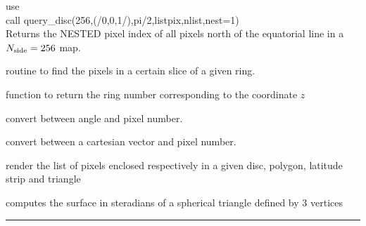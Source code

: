 \begin{example}
{
use  \\
call query\_disc(256,(/0,0,1/),pi/2,listpix,nlist,nest=1)  \\
}
{
Returns the NESTED pixel index of all pixels north of the equatorial line in a ${N_{\rm side}}=256$ map.
}
\end{example}
\begin{modules}
  \begin{sulist}{} %
 \item[\htmlref{in\_ring}{sub:in_ring}] routine to find the pixels in a certain slice of a given ring.		
 \item[\htmlref{ring\_num}{sub:ring_num}] function to return the ring number corresponding to the coordinate $z$
  \end{sulist}
\end{modules}

\begin{related}
  \begin{sulist}{} %
  \item[\htmlref{pix2ang}{sub:pix_tools}, \htmlref{ang2pix}{sub:pix_tools}] convert between angle and pixel number.
  \item[\htmlref{pix2vec}{sub:pix_tools}, \htmlref{vec2pix}{sub:pix_tools}] convert between a cartesian vector and pixel number.
  \item[query\_disc, \htmlref{query\_polygon}{sub:query_polygon},]
  \item[\htmlref{query\_strip}{sub:query_strip}, \htmlref{query\_triangle}{sub:query_triangle}] render the list of pixels enclosed
  respectively in a given disc, polygon, latitude strip and triangle
  \item[\htmlref{surface\_triangle}{sub:surface_triangle}] computes the surface
in steradians of a spherical triangle defined by 3 vertices

  \end{sulist}
\end{related}

\rule{\hsize}{2mm}

\newpage
